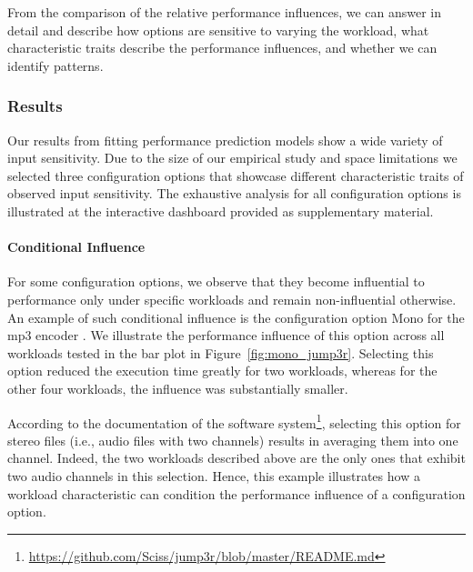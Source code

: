 {{{From the comparison of the relative performance influences, we can answer  in detail and describe how options are sensitive to varying the workload, what characteristic traits describe the performance influences, and whether we can identify patterns.

\subsubsection{Results}\label{sec:results2}
{\color{edited}
Our results from fitting performance prediction models show a wide variety of input sensitivity. Due to the size of our empirical study and space limitations we selected three configuration options that showcase different characteristic traits of observed input sensitivity. The exhaustive analysis for all configuration options is illustrated at the interactive dashboard provided as supplementary material.

\paragraph{Conditional Influence}\label{sec:conditional_influence} For some configuration options, we observe that they become influential to performance only under specific workloads and remain non-influential otherwise. An example of such conditional influence is the configuration option \textsf{Mono} for the mp3 encoder \jumper. We illustrate the performance influence of this option across all workloads tested in the bar plot in Figure~\ref{fig:mono_jump3r}. Selecting this option reduced the execution time greatly for two workloads, whereas for the other four workloads, the influence  was substantially smaller.

According to the documentation of the software system\footnote{\url{https://github.com/Sciss/jump3r/blob/master/README.md}}, selecting this option for stereo files (i.e., audio files with two channels) results in averaging them into one channel. Indeed, the two workloads described above are the only ones that exhibit two audio channels in this selection. Hence, this example illustrates how a workload  characteristic can condition the performance influence of a configuration option. 

}}}}
